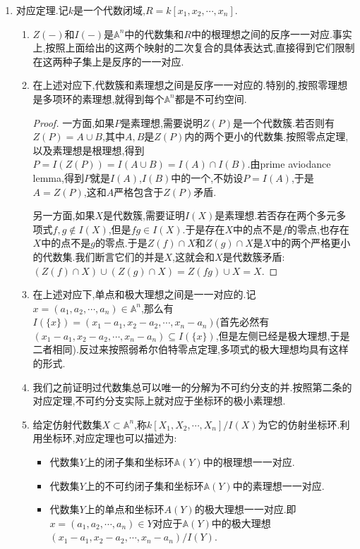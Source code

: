 \begin{enumerate}
\begin{enumerate}
\begin{proof}
    		一方面按照$Y\subseteq Z(I(Y))$以及后者是闭集,得到$\overline{Y}\subseteq Z(I(Y))$;另一方面任取包含$Y$的闭集$Z(\alpha)$,得到$Z(I(Y))\subseteq Z(I(Z(\alpha)))=Z(\alpha)$.
    	\end{proof}
    \end{enumerate}
    \item 对应定理.记$k$是一个代数闭域,$R=k[x_1,x_2,\cdots,x_n]$.
    \begin{enumerate}
    	\item $Z(-)$和$I(-)$是$\mathbb{A}^n$中的代数集和$R$中的根理想之间的反序一一对应.事实上,按照上面给出的这两个映射的二次复合的具体表达式,直接得到它们限制在这两种子集上是反序的一一对应.
    	\item 在上述对应下,代数簇和素理想之间是反序一一对应的.特别的,按照零理想是多项环的素理想,就得到每个$\mathbb{A}^n$都是不可约空间.
    	\begin{proof}
    		
    		一方面,如果$P$是素理想,需要说明$Z(P)$是一个代数簇.若否则有$Z(P)=A\cup B$,其中$A,B$是$Z(P)$内的两个更小的代数集.按照零点定理,以及素理想是根理想,得到$P=I(Z(P))=I(A\cup B)=I(A)\cap I(B)$.由prime aviodance lemma,得到$P$就是$I(A)$,$I(B)$中的一个,不妨设$P=I(A)$,于是$A=Z(P)$,这和$A$严格包含于$Z(P)$矛盾.
    		
    		另一方面,如果$X$是代数簇,需要证明$I(X)$是素理想.若否存在两个多元多项式$f,g\not\in I(X)$,但是$fg\in I(X)$.于是存在$X$中的点不是$f$的零点,也存在$X$中的点不是$g$的零点.于是$Z(f)\cap X$和$Z(g)\cap X$是$X$中的两个严格更小的代数集.我们断言它们的并是$X$,这就会和$X$是代数簇矛盾:$(Z(f)\cap X)\cup(Z(g)\cap X)=Z(fg)\cup X=X$.
    	\end{proof}
    	\item 在上述对应下,单点和极大理想之间是一一对应的.记$x=(a_1,a_2,\cdots,a_n)\in\mathbb{A}^n$,那么有$I(\{x\})=(x_1-a_1,x_2-a_2,\cdots,x_n-a_n)$(首先必然有$(x_1-a_1,x_2-a_2,\cdots,x_n-a_n)\subseteq I(\{x\})$,但是左侧已经是极大理想,于是二者相同).反过来按照弱希尔伯特零点定理,多项式的极大理想均具有这样的形式.
    	\item 我们之前证明过代数集总可以唯一的分解为不可约分支的并.按照第二条的对应定理,不可约分支实际上就对应于坐标环的极小素理想.
    	\item 给定仿射代数集$X\subset\mathbb{A}^n$,称$k[X_1,X_2,\cdots,X_n]/I(X)$为它的仿射坐标环.利用坐标环,对应定理也可以描述为:
    	\begin{itemize}
    		\item 代数集$Y$上的闭子集和坐标环$\mathbb{A}(Y)$中的根理想一一对应.
    		\item 代数集$Y$上的不可约闭子集和坐标环$\mathbb{A}(Y)$中的素理想一一对应.
    		\item 代数集$Y$上的单点和坐标环$A(Y)$的极大理想一一对应.即$x=(a_1,a_2,\cdots,a_n)\in Y$对应于$\mathbb{A}(Y)$中的极大理想$(x_1-a_1,x_2-a_2,\cdots,x_n-a_n)/I(Y)$.
    	\end{itemize}
    \end{enumerate}
\end{enumerate}
